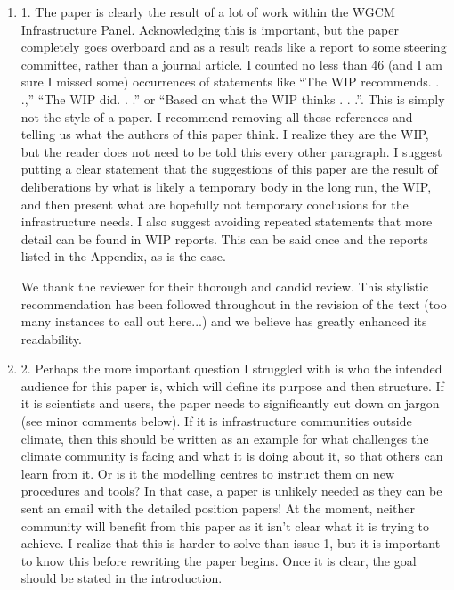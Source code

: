 \documentclass[gmd,manuscript]{copernicus}
\newenvironment{answer}{\color{blue}}{}
\begin{document}
\begin{enumerate}[label=RC3-\arabic*,leftmargin=*]
\item 1. The paper is clearly the result of a lot of work within the
  WGCM Infrastructure Panel. Acknowledging this is important, but the
  paper completely goes overboard and as a result reads like a report
  to some steering committee, rather than a journal article. I counted
  no less than 46 (and I am sure I missed some) occurrences of
  statements like “The WIP recommends. . .,” “The WIP did. . .” or
  “Based on what the WIP thinks . . .”. This is simply not the style
  of a paper. I recommend removing all these references and telling us
  what the authors of this paper think. I realize they are the WIP,
  but the reader does not need to be told this every other paragraph.
  I suggest putting a clear statement that the suggestions of this
  paper are the result of deliberations by what is likely a temporary
  body in the long run, the WIP, and then present what are hopefully
  not temporary conclusions for the infrastructure needs. I also
  suggest avoiding repeated statements that more detail can be found
  in WIP reports. This can be said once and the reports listed in the
  Appendix, as is the case.

  \begin{answer}
    We thank the reviewer for their thorough and candid review. This
    stylistic recommendation has been followed throughout in the
    revision of the text (too many instances to call out here...) and
    we believe has greatly enhanced its readability.
  \end{answer}
\item 2. Perhaps the more important question I struggled with is who the
  intended audience for this paper is, which will define its purpose
  and then structure. If it is scientists and users, the paper needs
  to significantly cut down on jargon (see minor comments below). If
  it is infrastructure communities outside climate, then this should
  be written as an example for what challenges the climate community
  is facing and what it is doing about it, so that others can learn
  from it. Or is it the modelling centres to instruct them on new
  procedures and tools? In that case, a paper is unlikely needed as
  they can be sent an email with the detailed position papers! At the
  moment, neither community will benefit from this paper as it isn’t
  clear what it is trying to achieve. I realize that this is harder to
  solve than issue 1, but it is important to know this before
  rewriting the paper begins. Once it is clear, the goal should be
  stated in the introduction.


\end{enumerate}
\end{document}
